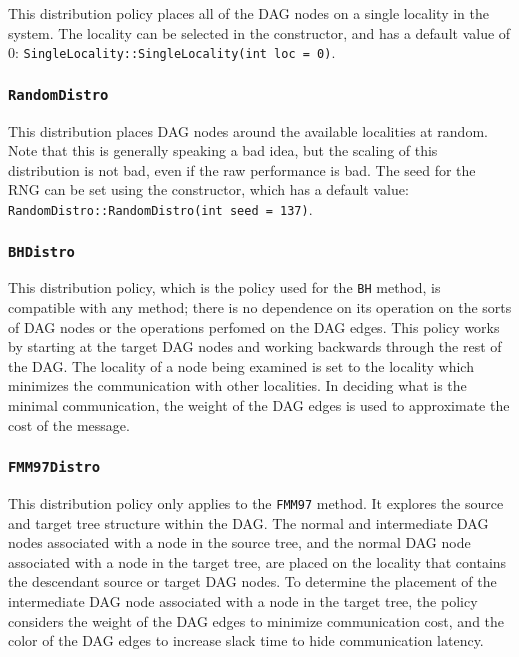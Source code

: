This distribution policy places all of the DAG nodes on a single locality in
the system. The locality can be selected in the constructor, and has a default
value of 0: \texttt{SingleLocality::SingleLocality(int loc = 0)}.

\subsubsection{\texttt{RandomDistro}}

This distribution places DAG nodes around the available localities at random.
Note that this is generally speaking a bad idea, but the scaling of this
distribution is not bad, even if the raw performance is bad. The seed for the
RNG can be set using the constructor, which has a default value:
\texttt{RandomDistro::RandomDistro(int seed = 137)}.

\subsubsection{\texttt{BHDistro}}

This distribution policy, which is the policy used for the \texttt{BH} method,
is compatible with any method; there is no dependence on its operation on the
sorts of DAG nodes or the operations perfomed on the DAG edges. This policy
works by starting at the target DAG nodes and working backwards through the
rest of the DAG. The locality of a node being examined is set to the locality
which minimizes the communication with other localities. In deciding what is
the minimal communication, the weight of the DAG edges is used to approximate
the cost of the message.

\subsubsection{\texttt{FMM97Distro}}

This distribution policy only applies to the \texttt{FMM97} method. It explores
the source and target tree structure within the DAG. The normal and intermediate
DAG nodes associated with a node in the source tree, and the normal DAG node
associated with a node in the target tree, are placed on the locality that
contains the descendant source or target DAG nodes. To determine the placement
of the intermediate DAG node associated with a node in the target tree, the
policy considers the weight of the DAG edges to minimize communication cost, and
the color of the DAG edges to increase slack time to hide communication
latency. 

